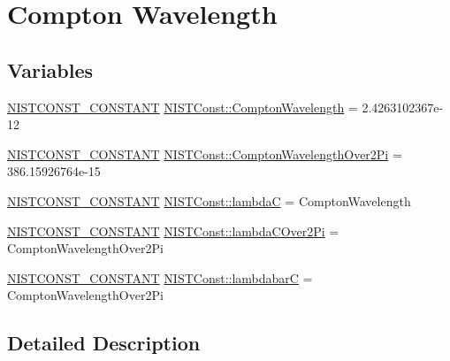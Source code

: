\hypertarget{group___n_i_s_t_const-_compton_wavelength}{}\section{Compton Wavelength}
\label{group___n_i_s_t_const-_compton_wavelength}
\subsection*{Variables}
\begin{DoxyCompactItemize}
\item 
\mbox{\hyperlink{group___n_i_s_t_const-_macros_ga2b0fc1d7452373f816175dd86ce26729}{N\+I\+S\+T\+C\+O\+N\+S\+T\+\_\+\+C\+O\+N\+S\+T\+A\+NT}} \mbox{\hyperlink{group___n_i_s_t_const-_compton_wavelength_ga9e52f9c08046cc0ec310fdf0137cdcda}{N\+I\+S\+T\+Const\+::\+Compton\+Wavelength}} = 2.\+4263102367e-\/12
\item 
\mbox{\hyperlink{group___n_i_s_t_const-_macros_ga2b0fc1d7452373f816175dd86ce26729}{N\+I\+S\+T\+C\+O\+N\+S\+T\+\_\+\+C\+O\+N\+S\+T\+A\+NT}} \mbox{\hyperlink{group___n_i_s_t_const-_compton_wavelength_gabba37dafb84b4faabc2d90a8a7d0ce2a}{N\+I\+S\+T\+Const\+::\+Compton\+Wavelength\+Over2\+Pi}} = 386.\+15926764e-\/15
\item 
\mbox{\hyperlink{group___n_i_s_t_const-_macros_ga2b0fc1d7452373f816175dd86ce26729}{N\+I\+S\+T\+C\+O\+N\+S\+T\+\_\+\+C\+O\+N\+S\+T\+A\+NT}} \mbox{\hyperlink{group___n_i_s_t_const-_compton_wavelength_ga34f6c88f6505a376451da603db7abfc7}{N\+I\+S\+T\+Const\+::lambdaC}} = Compton\+Wavelength
\item 
\mbox{\hyperlink{group___n_i_s_t_const-_macros_ga2b0fc1d7452373f816175dd86ce26729}{N\+I\+S\+T\+C\+O\+N\+S\+T\+\_\+\+C\+O\+N\+S\+T\+A\+NT}} \mbox{\hyperlink{group___n_i_s_t_const-_compton_wavelength_ga52564ec6cd189739e0c8c3441b1ea460}{N\+I\+S\+T\+Const\+::lambda\+C\+Over2\+Pi}} = Compton\+Wavelength\+Over2\+Pi
\item 
\mbox{\hyperlink{group___n_i_s_t_const-_macros_ga2b0fc1d7452373f816175dd86ce26729}{N\+I\+S\+T\+C\+O\+N\+S\+T\+\_\+\+C\+O\+N\+S\+T\+A\+NT}} \mbox{\hyperlink{group___n_i_s_t_const-_compton_wavelength_ga88ba617a2d5943169f5b1bec003c07ad}{N\+I\+S\+T\+Const\+::lambdabarC}} = Compton\+Wavelength\+Over2\+Pi
\end{DoxyCompactItemize}


\subsection{Detailed Description}


